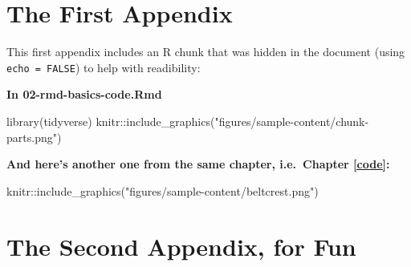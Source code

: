 \documentclass[a4paper, nobind]{templates/ociamthesis}
\newenvironment{Shaded}{\begin{snugshade}}{\end{snugshade}}
\newcommand{\FunctionTok}[1]{\textcolor[rgb]{0.00,0.00,0.00}{#1}}
\newcommand{\NormalTok}[1]{#1}
\newcommand{\SpecialCharTok}[1]{\textcolor[rgb]{0.00,0.00,0.00}{#1}}
\newcommand{\StringTok}[1]{\textcolor[rgb]{0.31,0.60,0.02}{#1}}
\renewenvironment{Shaded}
{
  \vspace{10pt}%
  \begin{snugshade}%
}{%
  \end{snugshade}%
  \vspace{8pt}%
}
\newcommand*{\bibtitle}{References}
\begin{document}
\startappendices

\hypertarget{the-first-appendix}{%
\chapter{The First Appendix}\label{the-first-appendix}}

This first appendix includes an R chunk that was hidden in the document (using \texttt{echo\ =\ FALSE}) to help with readibility:

\textbf{In 02-rmd-basics-code.Rmd}

\begin{Shaded}
\begin{Highlighting}[]
\FunctionTok{library}\NormalTok{(tidyverse)}
\NormalTok{knitr}\SpecialCharTok{::}\FunctionTok{include\_graphics}\NormalTok{(}\StringTok{"figures/sample{-}content/chunk{-}parts.png"}\NormalTok{)}
\end{Highlighting}
\end{Shaded}

\textbf{And here's another one from the same chapter, i.e.~Chapter \ref{code}:}

\begin{Shaded}
\begin{Highlighting}[]
\NormalTok{knitr}\SpecialCharTok{::}\FunctionTok{include\_graphics}\NormalTok{(}\StringTok{"figures/sample{-}content/beltcrest.png"}\NormalTok{)}
\end{Highlighting}
\end{Shaded}

\hypertarget{the-second-appendix-for-fun}{%
\chapter{The Second Appendix, for Fun}\label{the-second-appendix-for-fun}}




\setlength{\baselineskip}{0pt} %

{\renewcommand*\MakeUppercase[1]{#1}%
\printbibliography[heading=bibintoc,title={\bibtitle}]}
\end{document}
